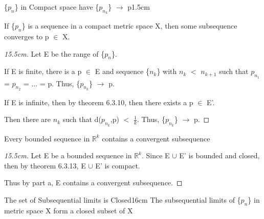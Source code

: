     \begin{ltheorem}{\{$p_n$\} in Compact space have
    \{$p_{n_k}$\} $\rightarrow$ p}{1.5cm}
        \item If \{$p_n$\} is a sequence in a compact metric space X,
            then some subsequence converges to p $\in$ X.

            \begin{proof}[15.5cm]
                Let E be the range of \{$p_n$\}.

                If E is finite, there is a p $\in$ E and sequence
                \{$n_k$\} with $n_k$ $<$ $n_{k+1}$ such that
                $p_{n_1}$ = $p_{n_2}$ = ... = p.
                Thus, \{$p_{n_k}$\} $\rightarrow$ p.

                If E is infinite, then by {\color{red} theorem 6.3.10},
                then there exists a p $\in$ E'.

                Then there are $n_k$ such that d($p_{n_k}$,p) $<$ $\frac{1}{k}$.
                Thus, \{$p_{n_k}$\} $\rightarrow$ p.                
            \end{proof}

        \item Every bounded sequence in $\mathbb{R}^k$ contains
            a convergent subsequence

            \begin{proof}[15.5cm]
                Let E be a bounded sequence in $\mathbb{R}^k$.
                Since E $\cup$ E' is bounded and closed, then by
                {\color{red} theorem 6.3.13}, E $\cup$ E' is compact.
                
                Thus by part a, E contains a convergent subsequence.
            \end{proof}
    \end{ltheorem}

    \vspace{0.5cm}



    \begin{wtheorem}{The set of Subsequential limits is Closed}{16cm}
        The subsequential limits of \{$p_n$\} in metric space X form
        a closed subset of X
    \end{wtheorem}
    
